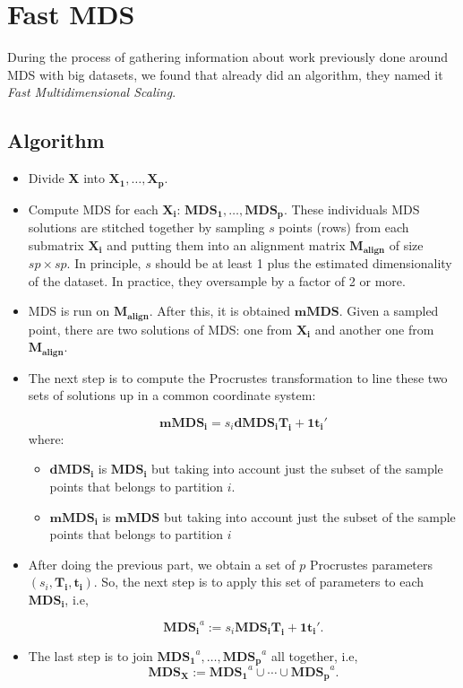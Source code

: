 \documentclass[11pt]{report}
\begin{document}
\section{Fast MDS}
During the process of gathering information about work previously done around
MDS with big datasets, we found that  already did an 
algorithm, they named it \textit{Fast Multidimensional Scaling}. 


\subsection{Algorithm}

\begin{itemize}

\item Divide \textbf{X} into $\mathbf{X_1},\dots, \mathbf{X_p}$.

\item Compute MDS for each $\mathbf{X_i}$: 
$\mathbf{MDS_1}, \dots, \mathbf{MDS_p}$. These individuals MDS solutions are 
stitched together by sampling $s$ points (rows) from each submatrix 
$\mathbf{X_i}$ and putting them into an alignment matrix 
$\mathbf{M_{align}}$ of size $sp \times sp$. In principle, $s$ should be at 
least 1 plus the estimated dimensionality of the dataset. In practice, they 
oversample by a factor of 2 or more. 

\item MDS is run on $\mathbf{M_{align}}$. After this, it is obtained
$\mathbf{mMDS}$. Given a sampled point, there are two solutions of MDS: 
one from $\mathbf{X_i}$ and another one from $\mathbf{M_{align}}$.

\item The next step is to compute the Procrustes transformation to  line  
these two sets of solutions up in a common coordinate system:

\[
\mathbf{mMDS_i} = s_i \mathbf{dMDS_i} \mathbf{T_i} + \mathbf{1t_i}'
\]
where:

\begin{itemize}

\item $\mathbf{dMDS_i}$ is $\mathbf{MDS_i}$ but taking into account just
the subset of the sample points that belongs to partition $i$.

\item $\mathbf{mMDS_i}$ is $\mathbf{mMDS}$ but taking into account just
the subset of the sample points that belongs to partition $i$
\end{itemize}

\item After doing the previous part, we obtain a set of $p$ Procrustes 
parameters $(s_i, \mathbf{T_i},  \mathbf{t_i})$. So, the next step is to 
apply this set of parameters to each $\mathbf{MDS_i}$, i.e, 

\[
\mathbf{MDS_i}^a := s_i \mathbf{MDS_i} \mathbf{T_i} + \mathbf{1t_i'}.
\]

\item The last step is to join $\mathbf{MDS_1}^a, \dots,  \mathbf{MDS_p}^a$ 
all together, i.e, 
\[
\mathbf{MDS_X}:= \mathbf{MDS_1}^a \cup \cdots \cup \mathbf{MDS_p}^a.
\]

\end{itemize}
\end{document}
